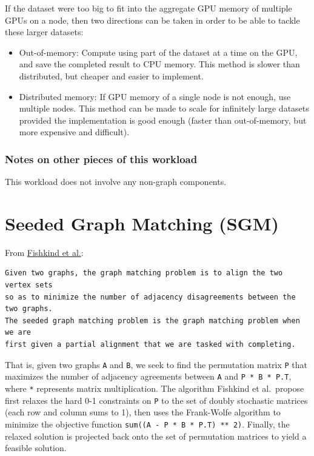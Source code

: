 \documentclass[10pt,oneside]{memoir}
\providecommand{\tightlist}{%
  \setlength{\itemsep}{0pt}\setlength{\parskip}{0pt}}
\begin{document}
If the dataset were too big to fit into the aggregate GPU memory of
multiple GPUs on a node, then two directions can be taken in order to be
able to tackle these larger datasets:

\begin{itemize}
\tightlist
\item
  Out-of-memory: Compute using part of the dataset at a time on the GPU,
  and save the completed result to CPU memory. This method is slower
  than distributed, but cheaper and easier to implement.
\item
  Distributed memory: If GPU memory of a single node is not enough, use
  multiple nodes. This method can be made to scale for infinitely large
  datasets provided the implementation is good enough (faster than
  out-of-memory, but more expensive and difficult).
\end{itemize}

\hypertarget{notes-on-other-pieces-of-this-workload-6}{%
\subsection{Notes on other pieces of this
workload}\label{notes-on-other-pieces-of-this-workload-6}}

This workload does not involve any non-graph components.

\hypertarget{seeded-graph-matching-sgm-1}{%
\chapter{Seeded Graph Matching
(SGM)}\label{seeded-graph-matching-sgm-1}}

From \href{https://arxiv.org/pdf/1209.0367.pdf}{Fishkind et al.}:

\begin{verbatim}
Given two graphs, the graph matching problem is to align the two vertex sets
so as to minimize the number of adjacency disagreements between the two graphs.
The seeded graph matching problem is the graph matching problem when we are
first given a partial alignment that we are tasked with completing.
\end{verbatim}

That is, given two graphs \texttt{A} and \texttt{B}, we seek to find the
permutation matrix \texttt{P} that maximizes the number of adjacency
agreements between \texttt{A} and \texttt{P\ *\ B\ *\ P.T}, where
\texttt{*} represents matrix multiplication. The algorithm Fishkind et
al.~propose first relaxes the hard 0-1 constraints on \texttt{P} to the
set of doubly stochastic matrices (each row and column sums to 1), then
uses the Frank-Wolfe algorithm to minimize the objective function
\texttt{sum((A\ -\ P\ *\ B\ *\ P.T)\ **\ 2)}. Finally, the relaxed
solution is projected back onto the set of permutation matrices to yield
a feasible solution.
\end{document}
